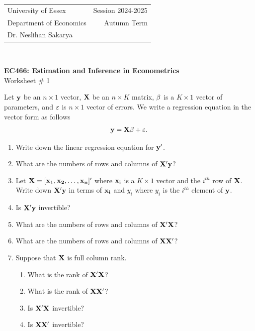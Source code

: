 \documentclass[12pt,a4paper]{article}
\newcommand{\by}{\bf{y}}
\newcommand{\bX}{\bf{X}}
\newcommand{\bx}{\bf{x}}
\newcommand{\beps}{\bf{\varepsilon}}
\newcommand{\bbeta}{\bf{\beta}}
\begin{document}
\begin{tabular}{l r}
University of Essex  \hspace{35ex}& Session 2024-2025 \\
Department of Economics \hspace{35ex} & Autumn Term\\
Dr. Neslihan Sakarya \hspace{35ex} &
\end{tabular}
\\
\begin{center}
\large{\textbf{EC466: Estimation and Inference in Econometrics}\\
Worksheet \# 1}
\end{center}
\vspace*{0.5cm}
Let $\by$ be an $n \times 1$ vector, $\bX$ be an $n \times K$ matrix, $\bbeta$ is a $K \times 1$ vector of parameters, and $\beps$ is $n \times 1$ vector of errors.  We write a regression equation in the vector form as follows
\begin{align*}
\by=\bX\beta+\beps.
\end{align*}
\begin{enumerate}
\item{Write down the linear regression equation for $\by'$. }
\item{What are the numbers of rows and columns of $\bX'\by$?}
\item{Let $\bX=[\bx_{1}, \bx_{2}, \dots, \bx_{n}]'$ where $\bx_{i}$ is a $K \times 1$ vector and the $i^{th}$ row of $\bX$. Write down $\bX'y$ in terms of $\bx_{i}$ and $y_{i}$ where $y_{i}$ is the $i^{th}$ element of $\by$.}
\item{Is $\bX'\by$ invertible?}
\item{What are the numbers of rows and columns of $\bX'\bX$?}
\item{What are the numbers of rows and columns of $\bX\bX'$?}
\item{Suppose that $\bX$ is full column rank.}
\begin{enumerate}
\item{What is the rank of $\bX'\bX$?}
\item{What is the rank of $\bX\bX'$?}
\item{Is $\bX'\bX$ invertible?}
\item{Is $\bX\bX'$ invertible?}
\end{enumerate}
\end{enumerate}
\end{document}
